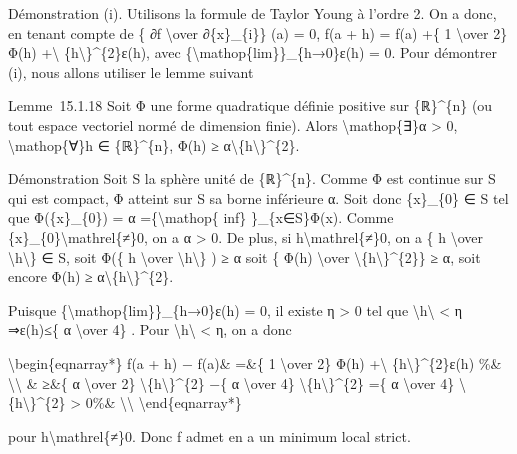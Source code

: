 Démonstration (i). Utilisons la formule de Taylor Young à l'ordre 2. On
a donc, en tenant compte de \{ ∂f \textbackslash{}over ∂\{x\}\_\{i\}\}
(a) = 0, f(a + h) = f(a) +\{ 1 \textbackslash{}over 2\} Φ(h)
+\textbackslash{}\textbar{}
\{h\textbackslash{}\textbar{}\}\^{}\{2\}ε(h), avec
\{\textbackslash{}mathop\{lim\}\}\_\{h→0\}ε(h) = 0. Pour démontrer (i),
nous allons utiliser le lemme suivant

Lemme~15.1.18 Soit Φ une forme quadratique définie positive sur
\{ℝ\}\^{}\{n\} (ou tout espace vectoriel normé de dimension finie).
Alors \textbackslash{}mathop\{∃\}α \textgreater{} 0,
\textbackslash{}mathop\{∀\}h ∈ \{ℝ\}\^{}\{n\}, Φ(h) ≥
α\textbackslash{}\textbar{}\{h\textbackslash{}\textbar{}\}\^{}\{2\}.

Démonstration Soit S la sphère unité de \{ℝ\}\^{}\{n\}. Comme Φ est
continue sur S qui est compact, Φ atteint sur S sa borne inférieure α.
Soit donc \{x\}\_\{0\} ∈ S tel que Φ(\{x\}\_\{0\}) = α
=\{\textbackslash{}mathop\{ inf\} \}\_\{x∈S\}Φ(x). Comme
\{x\}\_\{0\}\textbackslash{}mathrel\{≠\}0, on a α \textgreater{} 0. De
plus, si h\textbackslash{}mathrel\{≠\}0, on a \{ h \textbackslash{}over
\textbackslash{}\textbar{}h\textbackslash{}\textbar{}\} ∈ S, soit Φ(\{ h
\textbackslash{}over
\textbackslash{}\textbar{}h\textbackslash{}\textbar{}\} ) ≥ α soit \{
Φ(h) \textbackslash{}over
\textbackslash{}\textbar{}\{h\textbackslash{}\textbar{}\}\^{}\{2\}\} ≥
α, soit encore Φ(h) ≥
α\textbackslash{}\textbar{}\{h\textbackslash{}\textbar{}\}\^{}\{2\}.

Puisque \{\textbackslash{}mathop\{lim\}\}\_\{h→0\}ε(h) = 0, il existe η
\textgreater{} 0 tel que
\textbackslash{}\textbar{}h\textbackslash{}\textbar{} \textless{} η
⇒\textbar{}ε(h)\textbar{}≤\{ α \textbackslash{}over 4\} . Pour
\textbackslash{}\textbar{}h\textbackslash{}\textbar{} \textless{} η, on
a donc

\textbackslash{}begin\{eqnarray*\} f(a + h) − f(a)\& =\&\{ 1
\textbackslash{}over 2\} Φ(h) +\textbackslash{}\textbar{}
\{h\textbackslash{}\textbar{}\}\^{}\{2\}ε(h) \%\&
\textbackslash{}\textbackslash{} \& ≥\&\{ α \textbackslash{}over 2\}
\textbackslash{}\textbar{}\{h\textbackslash{}\textbar{}\}\^{}\{2\} −\{ α
\textbackslash{}over 4\}
\textbackslash{}\textbar{}\{h\textbackslash{}\textbar{}\}\^{}\{2\} =\{ α
\textbackslash{}over 4\}
\textbackslash{}\textbar{}\{h\textbackslash{}\textbar{}\}\^{}\{2\}
\textgreater{} 0\%\& \textbackslash{}\textbackslash{}
\textbackslash{}end\{eqnarray*\}

pour h\textbackslash{}mathrel\{≠\}0. Donc f admet en a un minimum local
strict.

